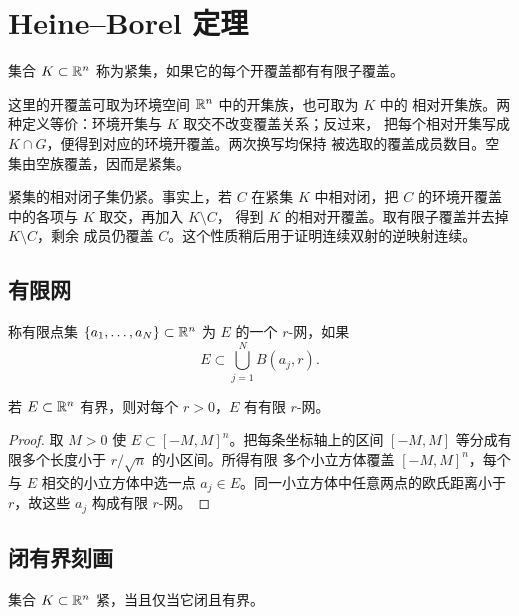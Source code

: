 \section{Heine--Borel 定理}

\begin{definition}[紧集]
集合 \(K\subset\mathbb{R}^n\) 称为紧集，如果它的每个开覆盖都有有限子覆盖。
\end{definition}

这里的开覆盖可取为环境空间 \(\mathbb{R}^n\) 中的开集族，也可取为 \(K\) 中的
相对开集族。两种定义等价：环境开集与 \(K\) 取交不改变覆盖关系；反过来，
把每个相对开集写成 \(K\cap G\)，便得到对应的环境开覆盖。两次换写均保持
被选取的覆盖成员数目。空集由空族覆盖，因而是紧集。

紧集的相对闭子集仍紧。事实上，若 \(C\) 在紧集 \(K\) 中相对闭，把
\(C\) 的环境开覆盖中的各项与 \(K\) 取交，再加入 \(K\setminus C\)，
得到 \(K\) 的相对开覆盖。取有限子覆盖并去掉 \(K\setminus C\)，剩余
成员仍覆盖 \(C\)。这个性质稍后用于证明连续双射的逆映射连续。

\subsection{有限网}

称有限点集
\(\{a_1,\ldots,a_N\}\subset\mathbb{R}^n\) 为 \(E\) 的一个
\(r\)-网，如果
\[
 E\subset\bigcup_{j=1}^N B(a_j,r).
\]

\begin{lemma}[欧氏有界集的有限网]
\label{lem:euclidean-bounded-finite-net}
若 \(E\subset\mathbb{R}^n\) 有界，则对每个 \(r>0\)，\(E\) 有有限
\(r\)-网。
\end{lemma}

\begin{proof}
取 \(M>0\) 使 \(E\subset[-M,M]^n\)。把每条坐标轴上的区间
\([-M,M]\) 等分成有限多个长度小于 \(r/\sqrt n\) 的小区间。所得有限
多个小立方体覆盖 \([-M,M]^n\)，每个与 \(E\) 相交的小立方体中选一点
\(a_j\in E\)。同一小立方体中任意两点的欧氏距离小于 \(r\)，故这些
\(a_j\) 构成有限 \(r\)-网。
\end{proof}

\subsection{闭有界刻画}

\begin{theorem}
\label{thm:euclidean-heine-borel}
集合 \(K\subset\mathbb{R}^n\) 紧，当且仅当它闭且有界。
\end{theorem}

